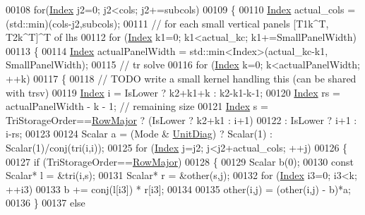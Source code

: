 \begin{DoxyCode}
00108       \textcolor{keywordflow}{for}(\hyperlink{namespace_eigen_a62e77e0933482dafde8fe197d9a2cfde}{Index} j2=0; j2<cols; j2+=subcols)
00109       \{
00110         \hyperlink{namespace_eigen_a62e77e0933482dafde8fe197d9a2cfde}{Index} actual\_cols = (std::min)(cols-j2,subcols);
00111         \textcolor{comment}{// for each small vertical panels [T1k^T, T2k^T]^T of lhs}
00112         \textcolor{keywordflow}{for} (\hyperlink{namespace_eigen_a62e77e0933482dafde8fe197d9a2cfde}{Index} k1=0; k1<actual\_kc; k1+=SmallPanelWidth)
00113         \{
00114           \hyperlink{namespace_eigen_a62e77e0933482dafde8fe197d9a2cfde}{Index} actualPanelWidth = std::min<Index>(actual\_kc-k1, SmallPanelWidth);
00115           \textcolor{comment}{// tr solve}
00116           \textcolor{keywordflow}{for} (\hyperlink{namespace_eigen_a62e77e0933482dafde8fe197d9a2cfde}{Index} k=0; k<actualPanelWidth; ++k)
00117           \{
00118             \textcolor{comment}{// TODO write a small kernel handling this (can be shared with trsv)}
00119             \hyperlink{namespace_eigen_a62e77e0933482dafde8fe197d9a2cfde}{Index} i  = IsLower ? k2+k1+k : k2-k1-k-1;
00120             \hyperlink{namespace_eigen_a62e77e0933482dafde8fe197d9a2cfde}{Index} rs = actualPanelWidth - k - 1; \textcolor{comment}{// remaining size}
00121             \hyperlink{namespace_eigen_a62e77e0933482dafde8fe197d9a2cfde}{Index} s  = TriStorageOrder==\hyperlink{group__enums_ggaacded1a18ae58b0f554751f6cdf9eb13acfcde9cd8677c5f7caf6bd603666aae3}{RowMajor} ? (IsLower ? k2+k1 : i+1)
00122                                                  :  IsLower ? i+1 : i-rs;
00123 
00124             Scalar a = (Mode & \hyperlink{group__enums_gga39e3366ff5554d731e7dc8bb642f83cdaddb72f888ac85d5a1c52333e54f9374b}{UnitDiag}) ? Scalar(1) : Scalar(1)/conj(tri(i,i));
00125             \textcolor{keywordflow}{for} (\hyperlink{namespace_eigen_a62e77e0933482dafde8fe197d9a2cfde}{Index} j=j2; j<j2+actual\_cols; ++j)
00126             \{
00127               \textcolor{keywordflow}{if} (TriStorageOrder==\hyperlink{group__enums_ggaacded1a18ae58b0f554751f6cdf9eb13acfcde9cd8677c5f7caf6bd603666aae3}{RowMajor})
00128               \{
00129                 Scalar b(0);
00130                 \textcolor{keyword}{const} Scalar* l = &tri(i,s);
00131                 Scalar* r = &other(s,j);
00132                 \textcolor{keywordflow}{for} (\hyperlink{namespace_eigen_a62e77e0933482dafde8fe197d9a2cfde}{Index} i3=0; i3<k; ++i3)
00133                   b += conj(l[i3]) * r[i3];
00134 
00135                 other(i,j) = (other(i,j) - b)*a;
00136               \}
00137               \textcolor{keywordflow}{else}

\end{DoxyCode}
